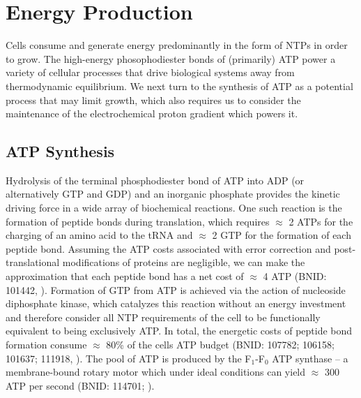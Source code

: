 \section{Energy Production}


Cells consume and generate energy predominantly in the form of NTPs in order to
grow. The high-energy phosophodiester bonds of (primarily) ATP power a variety
of cellular processes that drive biological systems away from thermodynamic
equilibrium. We next turn to the synthesis of ATP as a potential process that
may limit growth, which also requires us to consider the maintenance of the
electrochemical proton gradient which powers it.

\subsection{ATP Synthesis}
Hydrolysis of the terminal phosphodiester bond of ATP into ADP (or
alternatively GTP and GDP) and an inorganic phosphate provides the kinetic driving
force in a wide array of biochemical reactions. One such reaction is the
formation of peptide bonds during translation, which requires $\approx$ 2 ATPs
for the charging of an amino acid to the tRNA and $\approx$ 2 GTP for the
formation of each peptide bond. Assuming the ATP costs
associated with error correction and post-translational modifications of
proteins are negligible, we can make the approximation that each peptide bond
has a net cost of $\approx$ 4 ATP (BNID: 101442, \cite{milo2010}). Formation
of GTP from ATP is achieved via the action of nucleoside diphosphate kinase,
which catalyzes this reaction without an energy investment \citep{lascu2000}
and therefore consider all NTP requirements of the cell to be functionally
equivalent to being exclusively ATP. In total, the energetic costs of peptide
bond formation consume $\approx$ 80\% of the cells ATP budget (BNID: 107782;
106158; 101637; 111918, \cite{lynch2015,stouthamer1973}). The pool of ATP is
produced by the F$_1$-F$_0$ ATP synthase -- a membrane-bound rotary motor
which under ideal conditions can yield $\approx$ 300 ATP per second (BNID:
114701; \cite{weber2003}).

